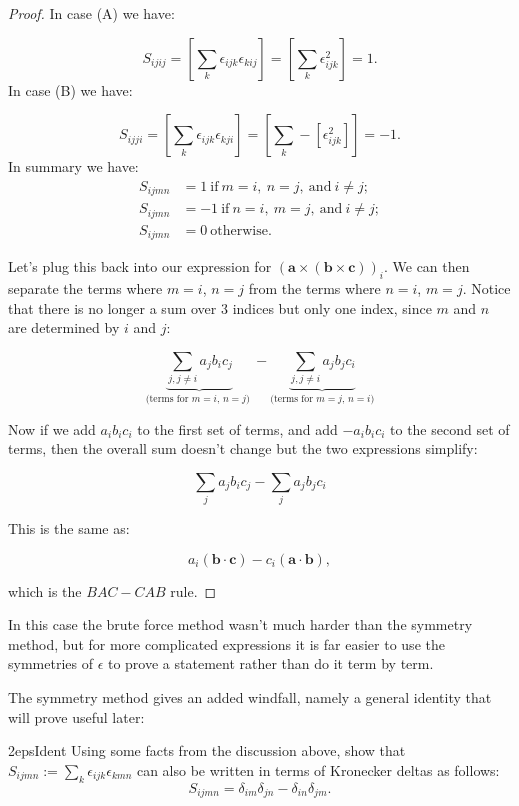 \begin{proof}
In case (A) we have:

\[ S_{ijij} =  \left[ \sum_k \epsilon_{ijk} \epsilon_{kij} \right] = \left[ \sum_k \epsilon_{ijk}^2 \right] = 1. \]
In case (B) we have:  

\[ S_{ijji} =  \left[ \sum_k \epsilon_{ijk} \epsilon_{kji} \right] = \left[ \sum_k -\left[\epsilon_{ijk}^2 \right] \right] = -1. \]
In summary we have:
\begin{align*}
S_{ijmn} &= 1 ~ \text{if}~ m=i,~ n=j, ~ \text{and}~ i\neq j ;\\
S_{ijmn}& = -1 ~ \text{if}~ n=i,~ m=j, ~ \text{and}~ i\neq j; \\
S_{ijmn}& = 0~\text{otherwise}.
\end{align*}

Let's plug this back into our expression for $ \left( \textbf{a} \times (\textbf{b} \times \textbf{c}) \right)_i$. We can then separate the terms where $m=i$, $n=j$ from the terms where $n=i$, $m=j$. Notice that there is no longer a sum over 3 indices but 
only one index, since $m$ and $n$ are determined by $i$ and $j$:

\[ \underbrace{\sum_{j, j \neq i}  a_j b_i c_j}_{\text{(terms for $m=i$, $n=j$) }}    -  \underbrace{ \sum_{j, j \neq i}   a_j b_j c_i}_{\text{(terms for $m=j$, $n=i$)}} \] 
	                         	  


Now if we add $a_i b_i c_i$ to the first set of terms, and add $-a_i b_i c_i$ to the second set of terms, then the overall sum doesn't change but the two 
expressions simplify:

\[ \sum_{j}  a_j b_i c_j    -  \sum_{j}   a_j b_j c_i  \]

This is the same as:

\[ a_i  (\textbf{b} \cdot \textbf{c}) - c_i (\textbf{a} \cdot \textbf{b}), \]

which is the $BAC-CAB$ rule.  
\end{proof}

In this case the brute force method wasn't much harder than the symmetry method, but for more complicated expressions it is far easier to use the symmetries of $\epsilon$ to prove a statement rather than do it term by term.

The symmetry method gives an added windfall, namely a general identity that will prove useful later:

\begin{exercise}{2epsIdent}
Using some facts from the discussion above, show that  $S_{ijmn} :=  \sum_k \epsilon_{ijk} \epsilon_{kmn}$ can also be written in terms of Kronecker deltas as follows:
\[S_{ijmn} = \delta_{im} \delta_{jn} - \delta_{in} \delta_{jm}. \]
\end{exercise}


